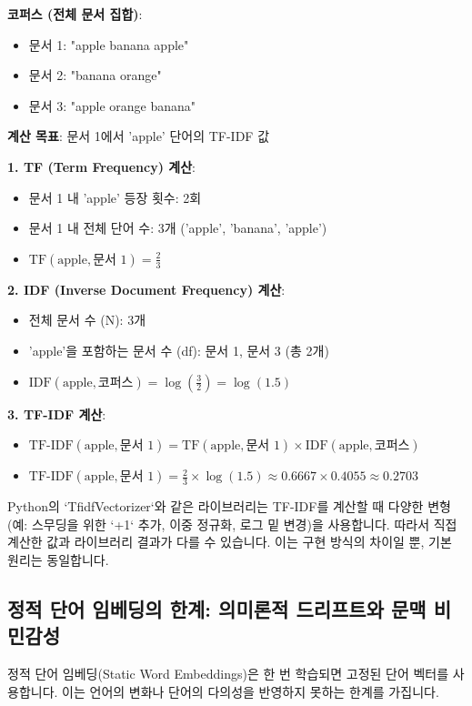\documentclass[11pt,a4paper]{article}
\begin{document}
\begin{examplebox}[TF-IDF 계산]
\textbf{코퍼스 (전체 문서 집합)}:
\begin{itemize}
    \item 문서 1: "apple banana apple"
    \item 문서 2: "banana orange"
    \item 문서 3: "apple orange banana"
\end{itemize}
\textbf{계산 목표}: 문서 1에서 'apple' 단어의 TF-IDF 값

\textbf{1. TF (Term Frequency) 계산}:
\begin{itemize}
    \item 문서 1 내 'apple' 등장 횟수: 2회
    \item 문서 1 내 전체 단어 수: 3개 ('apple', 'banana', 'apple')
    \item $\text{TF}(\text{apple}, \text{문서 1}) = \frac{2}{3}$
\end{itemize}

\textbf{2. IDF (Inverse Document Frequency) 계산}:
\begin{itemize}
    \item 전체 문서 수 (N): 3개
    \item 'apple'을 포함하는 문서 수 (df): 문서 1, 문서 3 (총 2개)
    \item $\text{IDF}(\text{apple}, \text{코퍼스}) = \log\left(\frac{3}{2}\right) = \log(1.5)$
\end{itemize}

\textbf{3. TF-IDF 계산}:
\begin{itemize}
    \item $\text{TF-IDF}(\text{apple}, \text{문서 1}) = \text{TF}(\text{apple}, \text{문서 1}) \times \text{IDF}(\text{apple}, \text{코퍼스})$
    \item $\text{TF-IDF}(\text{apple}, \text{문서 1}) = \frac{2}{3} \times \log(1.5) \approx 0.6667 \times 0.4055 \approx 0.2703$
\end{itemize}
\end{examplebox}

\begin{warningbox}
Python의 `TfidfVectorizer`와 같은 라이브러리는 TF-IDF를 계산할 때 다양한 변형(예: 스무딩을 위한 `+1` 추가, 이중 정규화, 로그 밑 변경)을 사용합니다. 따라서 직접 계산한 값과 라이브러리 결과가 다를 수 있습니다. 이는 구현 방식의 차이일 뿐, 기본 원리는 동일합니다.
\end{warningbox}

\newpage
\subsection{정적 단어 임베딩의 한계: 의미론적 드리프트와 문맥 비민감성}
정적 단어 임베딩(Static Word Embeddings)은 한 번 학습되면 고정된 단어 벡터를 사용합니다. 이는 언어의 변화나 단어의 다의성을 반영하지 못하는 한계를 가집니다.
\end{document}
